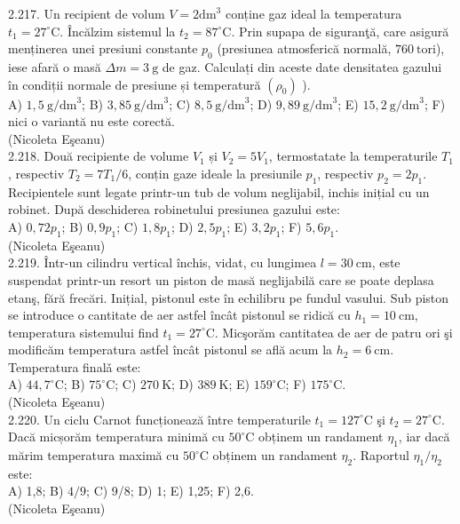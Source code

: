 2.217. Un recipient de volum $V=2 \mathrm{dm}^{3}$ conține gaz ideal la temperatura $t_{1}=27^{\circ} \mathrm{C}$. Încălzim sistemul la $t_{2}=87^{\circ} \mathrm{C}$. Prin supapa de siguranţă, care asigură menținerea unei presiuni constante $p_{0}$ (presiunea atmosferică normală, $760 \mathrm{~tori}$), iese afară o masă $\Delta m=3 \mathrm{~g}$ de gaz. Calculați din aceste date densitatea gazului în condiții normale de presiune și temperatură $\left(\rho_{0}\right)$ ).\\ A) $1,5 \mathrm{~g} / \mathrm{dm}^{3}$; B) $3,85 \mathrm{~g} / \mathrm{dm}^{3}$; C) $8,5 \mathrm{~g} / \mathrm{dm}^{3}$; D) $9,89 \mathrm{~g} / \mathrm{dm}^{3}$; E) $15,2 \mathrm{~g} / \mathrm{dm}^{3}$; F) nici o variantă nu este corectă.\\ (Nicoleta Eşeanu)\\

2.218. Două recipiente de volume $V_{1}$ și $V_{2}=5 V_{1}$, termostatate la temperaturile $T_{1}$, respectiv $T_{2}=7 T_{1} / 6$, conțin gaze ideale la presiunile $p_{1}$, respectiv $p_{2}=2 p_{1}$. Recipientele sunt legate printr-un tub de volum neglijabil, inchis inițial cu un robinet. După deschiderea robinetului presiunea gazului este:\\ A) $0,72 p_{1}$; B) $0,9 p_{1}$; C) $1,8 p_{1}$; D) $2,5 p_{1}$; E) $3,2 p_{1}$; F) $5,6 p_{1}$.\\ (Nicoleta Eşeanu)\\

2.219. Într-un cilindru vertical închis, vidat, cu lungimea $l=30 \mathrm{~cm}$, este suspendat printr-un resort un piston de masă neglijabilă care se poate deplasa etanş, fără frecări. Inițial, pistonul este în echilibru pe fundul vasului. Sub piston se introduce o cantitate de aer astfel încât pistonul se ridică cu $h_{1}=10 \mathrm{~cm}$, temperatura sistemului find $t_{1}=27^{\circ} \mathrm{C}$. Micşorăm cantitatea de aer de patru ori şi modificăm temperatura astfel încât pistonul se află acum la $h_{2}=6 \mathrm{~cm}$. Temperatura finalǎ este:\\ A) $44,7^{\circ} \mathrm{C}$; B) $75^{\circ} \mathrm{C}$; C) $270 \mathrm{~K}$; D) $389 \mathrm{~K}$; E) $159^{\circ} \mathrm{C}$; F) $175^{\circ} \mathrm{C}$.\\ (Nicoleta Eşeanu)\\

2.220. Un ciclu Carnot funcționează între temperaturile $t_{1}=127^{\circ} \mathrm{C}$ şi $t_{2}=27^{\circ} \mathrm{C}$. Dacă micșorăm temperatura minimă cu $50^{\circ} \mathrm{C}$ obținem un randament $\eta_{1}$, iar dacă mărim temperatura maximă cu $50^{\circ} \mathrm{C}$ obținem un randament $\eta_{2}$. Raportul $\eta_{1} / \eta_{2}$ este:\\ A) 1,8; B) $4 / 9$; C) 9/8; D) 1; E) 1,25; F) 2,6.\\ (Nicoleta Eşeanu)\\


